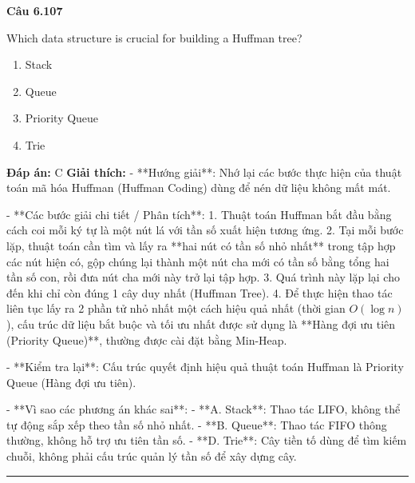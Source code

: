 \documentclass[11pt,a4paper]{article}
\newenvironment{question}[1]{%
  \par\vspace{1em}\noindent\textbf{\large Câu #1}\par\vspace{0.4em}
}{%
  \par\vspace{1em}\hrule\vspace{0.6em}
}
\newenvironment{choices}{%
  \begin{enumerate}[label=\textbf{\Alph*.},leftmargin=2.2em,itemsep=2pt,topsep=3pt]
}{%
  \end{enumerate}
}
\newcommand{\choice}{\item}
\begin{document}
\begin{question}{6.107}
Which data structure is crucial for building a Huffman tree?
\begin{choices}
\choice Stack
\choice Queue
\choice Priority Queue
\choice Trie
\end{choices}
\textbf{Đáp án:} C
\textbf{Giải thích:} - **Hướng giải**:
  Nhớ lại các bước thực hiện của thuật toán mã hóa Huffman (Huffman Coding) dùng để nén dữ liệu không mất mát.

- **Các bước giải chi tiết / Phân tích**:
  1. Thuật toán Huffman bắt đầu bằng cách coi mỗi ký tự là một nút lá với tần số xuất hiện tương ứng.
  2. Tại mỗi bước lặp, thuật toán cần tìm và lấy ra **hai nút có tần số nhỏ nhất** trong tập hợp các nút hiện có, gộp chúng lại thành một nút cha mới có tần số bằng tổng hai tần số con, rồi đưa nút cha mới này trở lại tập hợp.
  3. Quá trình này lặp lại cho đến khi chỉ còn đúng 1 cây duy nhất (Huffman Tree).
  4. Để thực hiện thao tác liên tục lấy ra 2 phần tử nhỏ nhất một cách hiệu quả nhất (thời gian \(O(\log n)\)), cấu trúc dữ liệu bắt buộc và tối ưu nhất được sử dụng là **Hàng đợi ưu tiên (Priority Queue)**, thường được cài đặt bằng Min-Heap.

- **Kiểm tra lại**:
  Cấu trúc quyết định hiệu quả thuật toán Huffman là Priority Queue (Hàng đợi ưu tiên).

- **Vì sao các phương án khác sai**:
  - **A. Stack**: Thao tác LIFO, không thể tự động sắp xếp theo tần số nhỏ nhất.
  - **B. Queue**: Thao tác FIFO thông thường, không hỗ trợ ưu tiên tần số.
  - **D. Trie**: Cây tiền tố dùng để tìm kiếm chuỗi, không phải cấu trúc quản lý tần số để xây dựng cây.
\end{question}
\end{document}
